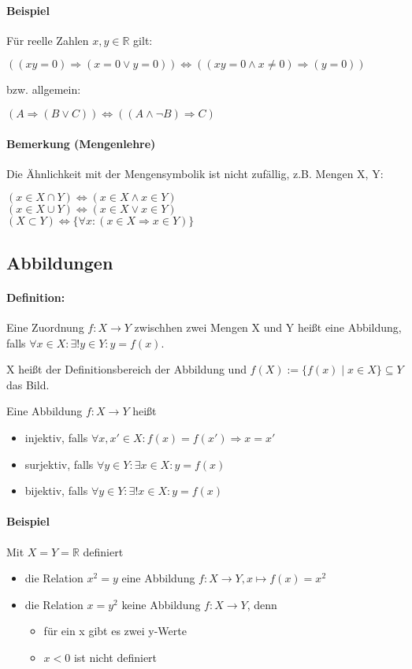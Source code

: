 \documentclass[12pt,a4paper,parskip=half-,DIV=15]{scrartcl}
\begin{document}
\paragraph{Beispiel} Für reelle Zahlen $x,y\in\mathbb{R}$ gilt:
\begin{center}
$\left((xy = 0)\Rightarrow (x=0 \lor y=0)\right) \Leftrightarrow \left((xy=0 \land x \neq 0)\Rightarrow (y =0)\right)$
\end{center}
bzw. allgemein:
\begin{center}
$(A\Rightarrow (B\lor C))\Leftrightarrow ((A\land\lnot B)\Rightarrow C)$
\end{center}

\paragraph{Bemerkung (Mengenlehre)} Die Ähnlichkeit mit der Mengensymbolik ist nicht zufällig, z.B. Mengen X, Y:
\begin{center}
$(x\in X\cap Y)\Leftrightarrow (x\in X\land x\in Y)$\\
$(x\in X\cup Y)\Leftrightarrow (x\in X\lor x\in Y)$\\
$(X\subset Y) \Leftrightarrow \{\forall x : (x\in X \Rightarrow x\in Y)\}$
\end{center}
\subsection{Abbildungen}

\paragraph{Definition:} Eine Zuordnung $f: X\to Y$ zwischhen zwei Mengen X und Y heißt eine Abbildung, falls $\forall x\in X: \exists ! y\in Y: y=f(x)$.

X heißt der Definitionsbereich der Abbildung und $f(X):=\{f(x)\mid x\in X \}\subseteq Y$ das Bild.

Eine Abbildung $f: X\to Y$ heißt
\begin{itemize}
\item injektiv, falls $\forall x,x'\in X:f(x) = f(x') \Rightarrow x=x'$
\item surjektiv, falls $\forall y\in Y:\exists x\in X: y = f(x)$
\item bijektiv, falls $\forall y\in Y:\exists !x\in X: y = f(x)$
\end{itemize}

\paragraph{Beispiel} Mit $X=Y=\mathbb{R}$ definiert
\begin{itemize}
\item die Relation $x^2 = y$ eine Abbildung $f:X\to Y, x\mapsto f(x)=x^2$
\item die Relation $x=y^2$ keine Abbildung $f:X\to Y$, denn
\begin{itemize}
\item für ein x gibt es zwei y-Werte
\item $x < 0$ ist nicht definiert
\end{itemize}
\end{itemize}
\end{document}
